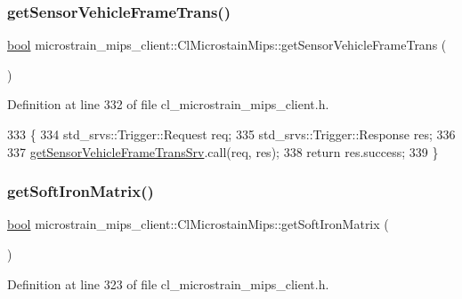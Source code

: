\subsubsection{\texorpdfstring{get\+Sensor\+Vehicle\+Frame\+Trans()}{getSensorVehicleFrameTrans()}}
{\footnotesize\ttfamily \hyperlink{classbool}{bool} microstrain\+\_\+mips\+\_\+client\+::\+Cl\+Microstain\+Mips\+::get\+Sensor\+Vehicle\+Frame\+Trans (\begin{DoxyParamCaption}{ }\end{DoxyParamCaption})\hspace{0.3cm}{\ttfamily [inline]}}



Definition at line 332 of file cl\+\_\+microstrain\+\_\+mips\+\_\+client.\+h.


\begin{DoxyCode}
333     \{
334         std\_srvs::Trigger::Request req;
335         std\_srvs::Trigger::Response res;
336 
337         \hyperlink{classmicrostrain__mips__client_1_1ClMicrostainMips_a9f255bbd963a48afee1b042ef9ba3065}{getSensorVehicleFrameTransSrv}.call(req, res);
338         \textcolor{keywordflow}{return} res.success;
339     \}
\end{DoxyCode}
\mbox{\label{classmicrostrain__mips__client_1_1ClMicrostainMips_a1bfdd1f0a1294d6e86f5ad79e74e03c9}} 
\subsubsection{\texorpdfstring{get\+Soft\+Iron\+Matrix()}{getSoftIronMatrix()}}
{\footnotesize\ttfamily \hyperlink{classbool}{bool} microstrain\+\_\+mips\+\_\+client\+::\+Cl\+Microstain\+Mips\+::get\+Soft\+Iron\+Matrix (\begin{DoxyParamCaption}{ }\end{DoxyParamCaption})\hspace{0.3cm}{\ttfamily [inline]}}



Definition at line 323 of file cl\+\_\+microstrain\+\_\+mips\+\_\+client.\+h.


